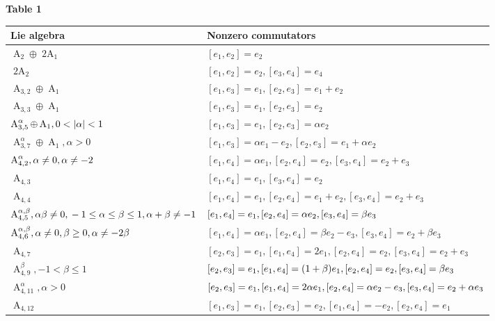 \documentclass[12pt,a4paper,twoside]{article}
\theoremstyle{definition}
\begin{document}
\begin{center}
\textbf{Table 1} \vspace{2mm}
	
\begin{tabular}{|p{3.5cm}|p{10cm}|} \hline
Lie algebra  & Nonzero commutators  \\ \hline
$ \operatorname{A}_2 \oplus \operatorname{2A}_1 $ & $[e_1, e_2] = e_2$ \\ \hline
$ \operatorname{2A}_2 $ &  $[e_1, e_2] = e_2, [e_3, e_4] = e_4$ \\ \hline
$ \operatorname{A}_{3, 2} \oplus \operatorname{A}_1 $ & $[e_1, e_3] = e_1, [e_2, e_3] = e_1 + e_2$ \\ \hline
$ \operatorname{A}_{3, 3} \oplus \operatorname{A}_1 $ & $[e_1, e_3] = e_1, [e_2, e_3] = e_2$ \\ \hline
$\operatorname{A}_{3, 5}^{\alpha} \oplus \operatorname{A}_1, \newline
0 < \left| \alpha \right|  < 1 $  & $[e_1, e_3] = e_1, [e_2, e_3] = \alpha e_2$ \\ \hline
$ \operatorname{A}_{3, 7}^{\alpha} \oplus \operatorname{A}_1, \alpha > 0 $ &$[e_1, e_3] = \alpha e_1 - e_2, [e_2, e_3] = e_1 + \alpha e_2$ \\ \hline
$ \operatorname{A}_{4, 2}^{\alpha}, \alpha \neq 0,\newline
\alpha \neq -2 $ & $[e_1, e_4] = \alpha e_1, [e_2, e_4] = e_2, [e_3, e_4] = e_2 + e_3$ \\ \hline
$ \operatorname{A}_{4, 3} $ & $[e_1, e_4] = e_1, [e_3, e_4] = e_2$ \\ \hline
$ \operatorname{A}_{4, 4} $ & $[e_1, e_4] = e_1, [e_2, e_4] = e_1 + e_2, [e_3, e_4] = e_2 + e_3$  \\ \hline
$ \operatorname{A}_{4, 5}^{\alpha, \beta}, \alpha\beta \neq 0, \newline
-1 \leq \alpha \leq \beta \leq 1,\newline
\alpha + \beta \neq -1 $ & $\newline
[e_1, e_4] = e_1, [e_2, e_4] = \alpha e_2, [e_3, e_4] = \beta e_3$  \\ \hline
$ \operatorname{A}_{4, 6}^{\alpha, \beta}, \alpha \neq 0, \newline
\beta \geq 0, \alpha \neq -2\beta $ & $[e_1, e_4] = \alpha e_1, [e_2, e_4] = \beta e_2 - e_3, [e_3, e_4] = e_2 + \beta e_3$  \\ \hline	
$ \operatorname{A}_{4, 7} $ & $[e_2, e_3] = e_1, [e_1, e_4] = 2e_1, [e_2, e_4] = e_2, [e_3, e_4] = e_2 + e_3$  \\ \hline
$ \operatorname{A}_{4, 9}^{\beta}, -1 < \beta \leq 1 $ & $[e_2, e_3] = e_1, [e_1, e_4] = (1 + \beta)e_1, [e_2, e_4] = e_2, \newline
[e_3, e_4] = \beta e_3$  \\ \hline
$ \operatorname{A}_{4, 11}^{\alpha}, \alpha > 0 $ & $[e_2, e_3] = e_1, [e_1, e_4] = 2\alpha e_1, [e_2, e_4] = \alpha e_2 - e_3, \newline
[e_3, e_4] = e_2 + \alpha e_3$  \\ \hline
$ \operatorname{A}_{4, 12} $ & $[e_1, e_3] = e_1, [e_2, e_3] = e_2, [e_1, e_4] = -e_2, [e_2, e_4] = e_1$  \\ \hline
\end{tabular}
\end{center}
\end{document}
